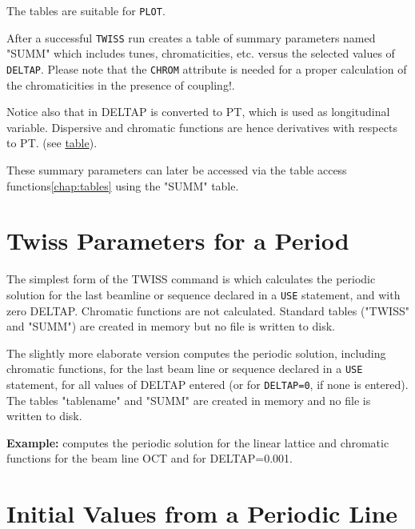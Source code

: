 The tables are suitable for \texttt{PLOT}.   

After a successful \texttt{TWISS} run \madx creates a 
table of summary parameters named "SUMM" which includes tunes,
chromaticities, etc. versus the selected values of \texttt{DELTAP}.
Please note that the \texttt{CHROM} attribute is needed
for a proper calculation of the chromaticities in the presence of
coupling!. 

Notice also that in \madx DELTAP is converted to PT, which is used as
longitudinal variable. 
Dispersive and chromatic functions are hence derivatives with
respects to PT. 
(see \href{../Introduction/tables.html#summ}{table}). 

These summary parameters can later be accessed via the table access
functions\ref{chap:tables} using the "SUMM" table.  

\section{Twiss Parameters for a Period}
\label{sec:twissperiod}

The simplest form of the TWISS command is
which calculates the periodic solution for the last beamline or sequence
declared in a \texttt{USE} statement, and with zero DELTAP.
Chromatic functions are not calculated. 
Standard tables ("TWISS" and "SUMM") are created in memory but no file
is written to disk. 

The slightly more elaborate version 
computes the periodic solution, including chromatic functions, for the last beam
line or sequence declared in a \texttt{USE} statement, for all values of
DELTAP entered (or for \texttt{DELTAP=0}, if none is entered). 
The tables "tablename" and "SUMM" are created in memory and no file is
written to disk. 

{\bf Example:} 
computes the periodic solution for the linear lattice and
chromatic functions for the beam line OCT and for DELTAP=0.001. 


\section{Initial Values from a Periodic Line}
\label{sec:twissinitial}


